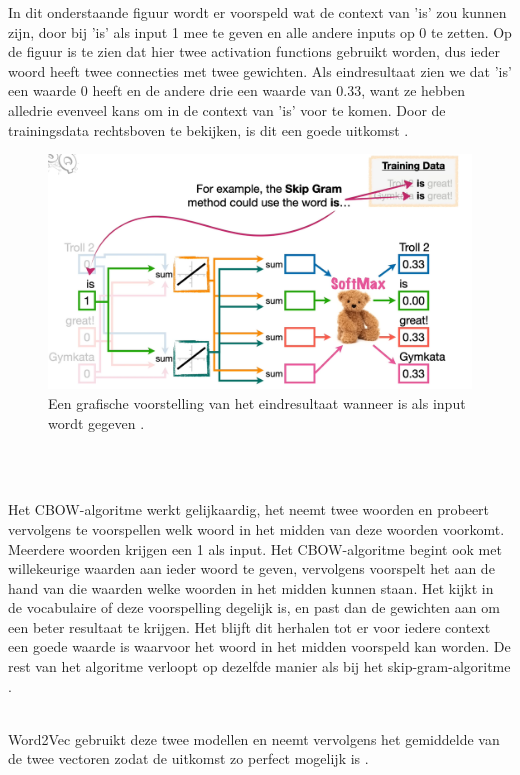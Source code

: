 In dit onderstaande figuur wordt er voorspeld wat de context van 'is' zou kunnen zijn, door bij 'is' als input 1 mee te geven en alle andere inputs op 0 te zetten. Op de figuur is te zien dat hier twee activation functions gebruikt worden, dus ieder woord heeft twee connecties met twee gewichten. Als eindresultaat zien we dat 'is' een waarde 0 heeft en de andere drie een waarde van 0.33, want ze hebben alledrie evenveel kans om in de context van 'is' voor te komen. Door de trainingsdata rechtsboven te bekijken, is dit een goede uitkomst \autocite{Starmer2023}.
\begin{figure}[h]
    \centering
    \includegraphics[width=0.7\linewidth]{../foto's/is-voorbeeld}
    \caption{Een grafische voorstelling van het eindresultaat wanneer is als input wordt gegeven \autocite{Starmer2023}.}
    \label{fig:eindresultaat_met_is_als_input}
\end{figure}
\\\indent

\\\indent
Het CBOW-algoritme werkt gelijkaardig, het neemt twee woorden en probeert vervolgens te voorspellen welk woord in het midden van deze woorden voorkomt. Meerdere woorden krijgen een 1 als input.
Het CBOW-algoritme begint ook met willekeurige waarden aan ieder woord te geven, vervolgens voorspelt het aan de hand van die waarden welke woorden in het midden kunnen staan. Het kijkt in de vocabulaire of deze voorspelling degelijk is, en past dan de gewichten aan om een beter resultaat te krijgen. Het blijft dit herhalen tot er voor iedere context een goede waarde is waarvoor het woord in het midden voorspeld kan worden. De rest van het algoritme verloopt op dezelfde manier als bij het skip-gram-algoritme \autocite{Starmer2023}.

\\\indent
Word2Vec gebruikt deze twee modellen en neemt vervolgens het gemiddelde van de twee vectoren zodat de uitkomst zo perfect mogelijk is \autocite{Starmer2023}.


